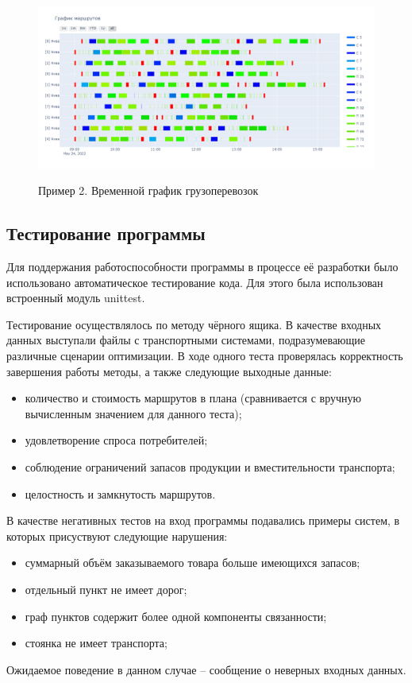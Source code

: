 \begin{figure}[h!]
	\begin{center}
		{\includegraphics[scale=0.38, angle=0, page=1]{img/demo_schedule_2.png}}
		\caption{Пример 2. Временной график грузоперевозок}
		\label{demo:schedule2}
	\end{center}
\end{figure}


\subsection{Тестирование программы}
Для поддержания работоспособности программы в процессе её разработки было использовано автоматическое тестирование кода. Для этого была использован встроенный модуль unittest\cite{libs:unittest}. 

Тестирование осуществлялось по методу чёрного ящика. В качестве входных данных выступали файлы с транспортными системами, подразумевающие различные сценарии оптимизации. В ходе одного теста проверялась корректность завершения работы методы, а также следующие выходные данные:

\begin{itemize}
	\item количество и стоимость маршрутов в плана (сравнивается с вручную вычисленным значением для данного теста);
	\item удовлетворение спроса потребителей;
	\item соблюдение ограничений запасов продукции и вместительности транспорта;
	\item целостность и замкнутость маршрутов.
\end{itemize}

В качестве негативных тестов на вход программы подавались примеры систем, в которых присуствуют следующие нарушения:
\begin{itemize}
	\item суммарный объём заказываемого товара больше имеющихся запасов;
	\item отдельный пункт не имеет дорог;
	\item граф пунктов содержит более одной компоненты связанности;
	\item стоянка не имеет транспорта;
\end{itemize} 
Ожидаемое поведение в данном случае -- сообщение о неверных входных данных.

